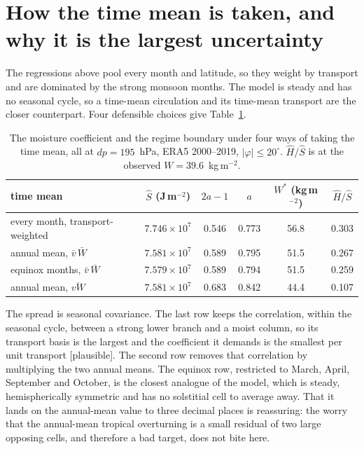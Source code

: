 \documentclass[11pt]{article}
\newcommand{\Shat}{\hat S}
\newcommand{\Hhat}{\hat H}
\newcommand{\Wstar}{W^*}
\begin{document}
\section{How the time mean is taken, and why it is the largest uncertainty}
\label{sec:aggregation}

The regressions above pool every month and latitude, so they weight by
transport and are dominated by the strong monsoon months. The model is steady
and has no seasonal cycle, so a time-mean circulation and its time-mean
transport are the closer counterpart. Four defensible choices give
Table~\ref{tab:aggregation}.

\begin{table}[htbp]
\centering
\caption{The moisture coefficient and the regime boundary under four ways of
taking the time mean, all at $dp = 195$~hPa, ERA5 2000--2019,
$|\varphi|\le20^\circ$. $\Hhat/\Shat$ is at the observed
$W = 39.6$~kg\,m$^{-2}$.}
\label{tab:aggregation}
\begin{tabular}{lccccc}
\toprule
time mean & $\Shat$ (J\,m$^{-2}$) & $2a-1$ & $a$ & $\Wstar$ (kg\,m$^{-2}$)
& $\Hhat/\Shat$\\
\midrule
every month, transport-weighted & $7.746\times10^{7}$ & 0.546 & 0.773 & 56.8 & 0.303\\
annual mean, $\bar v\,\bar W$   & $7.581\times10^{7}$ & 0.589 & 0.795 & 51.5 & 0.267\\
equinox months, $\bar v\,\bar W$& $7.579\times10^{7}$ & 0.589 & 0.794 & 51.5 & 0.259\\
annual mean, $\overline{vW}$    & $7.581\times10^{7}$ & 0.683 & 0.842 & 44.4 & 0.107\\
\bottomrule
\end{tabular}
\end{table}

The spread is seasonal covariance. The last row keeps the correlation, within
the seasonal cycle, between a strong lower branch and a moist column, so its
transport basis is the largest and the coefficient it demands is the smallest
per unit transport [plausible]. The second row removes that correlation by
multiplying the two annual means. The equinox row, restricted to March, April,
September and October, is the closest analogue of the model, which is steady,
hemispherically symmetric and has no solstitial cell to average away. That it
lands on the annual-mean value to three decimal places is reassuring: the
worry that the annual-mean tropical overturning is a small residual of two
large opposing cells, and therefore a bad target, does not bite here.
\end{document}
